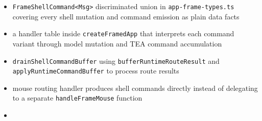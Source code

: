 \begin{itemize}
\tightlist
\item
  \texttt{F\allowbreak{}r\allowbreak{}a\allowbreak{}m\allowbreak{}e\allowbreak{}S\allowbreak{}h\allowbreak{}e\allowbreak{}l\allowbreak{}l\allowbreak{}C\allowbreak{}o\allowbreak{}m\allowbreak{}m\allowbreak{}a\allowbreak{}n\allowbreak{}d\allowbreak{}<\allowbreak{}M\allowbreak{}s\allowbreak{}g\allowbreak{}>} discriminated union in \texttt{a\allowbreak{}p\allowbreak{}p\allowbreak{}-\allowbreak{}f\allowbreak{}r\allowbreak{}a\allowbreak{}m\allowbreak{}e\allowbreak{}-\allowbreak{}t\allowbreak{}y\allowbreak{}p\allowbreak{}e\allowbreak{}s\allowbreak{}.\allowbreak{}t\allowbreak{}s} covering every shell mutation and command emission as plain data facts
\item
  a handler table inside \texttt{c\allowbreak{}r\allowbreak{}e\allowbreak{}a\allowbreak{}t\allowbreak{}e\allowbreak{}F\allowbreak{}r\allowbreak{}a\allowbreak{}m\allowbreak{}e\allowbreak{}d\allowbreak{}A\allowbreak{}p\allowbreak{}p} that interprets each command variant through model mutation and TEA command accumulation
\item
  \texttt{d\allowbreak{}r\allowbreak{}a\allowbreak{}i\allowbreak{}n\allowbreak{}S\allowbreak{}h\allowbreak{}e\allowbreak{}l\allowbreak{}l\allowbreak{}C\allowbreak{}o\allowbreak{}m\allowbreak{}m\allowbreak{}a\allowbreak{}n\allowbreak{}d\allowbreak{}B\allowbreak{}u\allowbreak{}f\allowbreak{}f\allowbreak{}e\allowbreak{}r} using \texttt{b\allowbreak{}u\allowbreak{}f\allowbreak{}f\allowbreak{}e\allowbreak{}r\allowbreak{}R\allowbreak{}u\allowbreak{}n\allowbreak{}t\allowbreak{}i\allowbreak{}m\allowbreak{}e\allowbreak{}R\allowbreak{}o\allowbreak{}u\allowbreak{}t\allowbreak{}e\allowbreak{}R\allowbreak{}e\allowbreak{}s\allowbreak{}u\allowbreak{}l\allowbreak{}t} and \texttt{a\allowbreak{}p\allowbreak{}p\allowbreak{}l\allowbreak{}y\allowbreak{}R\allowbreak{}u\allowbreak{}n\allowbreak{}t\allowbreak{}i\allowbreak{}m\allowbreak{}e\allowbreak{}C\allowbreak{}o\allowbreak{}m\allowbreak{}m\allowbreak{}a\allowbreak{}n\allowbreak{}d\allowbreak{}B\allowbreak{}u\allowbreak{}f\allowbreak{}f\allowbreak{}e\allowbreak{}r} to process route results
\item
  mouse routing handler produces shell commands directly instead of delegating to a separate \texttt{h\allowbreak{}a\allowbreak{}n\allowbreak{}d\allowbreak{}l\allowbreak{}e\allowbreak{}F\allowbreak{}r\allowbreak{}a\allowbreak{}m\allowbreak{}e\allowbreak{}M\allowbreak{}o\allowbreak{}u\allowbreak{}s\allowbreak{}e} function
\item

\end{itemize}
